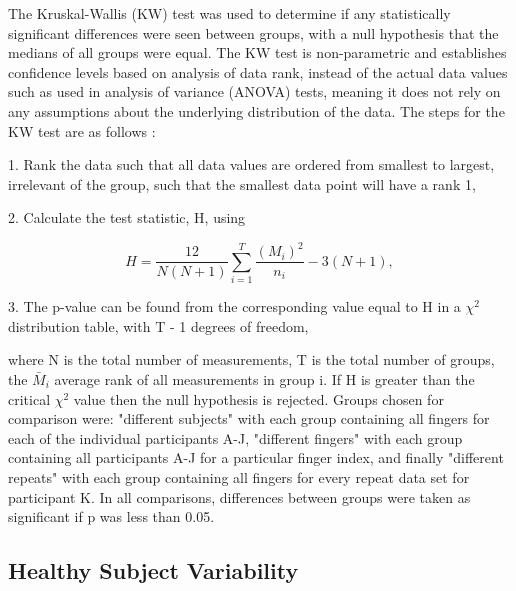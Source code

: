 \documentclass[twoside]{bhamthesis}
\theoremstyle{definition}
\begin{document}
The Kruskal-Wallis (KW) test was used to determine if any statistically significant differences were seen between groups, with a null hypothesis that the medians of all groups were equal. The KW test is non-parametric and establishes confidence levels based on analysis of data rank, instead of the actual data values such as used in analysis of variance (ANOVA) tests, meaning it does not rely on any assumptions about the underlying distribution of the data. The steps for the KW test are as follows \cite{altman1990practical}:

1. Rank the data such that all data values are ordered from smallest to largest, irrelevant of the group, such that the smallest data point will have a rank 1, 

2. Calculate the test statistic, H, using


\begin{equation}
 H =\frac{12}{N(N+1)} \sum_{i=1}^{T} \frac{(M_i)^2}{n_i} - 3(N+1),
  \label{eqn:dark_noise}
\end{equation}

3. The p-value can be found from the corresponding value equal to H in a $\chi^2$ distribution table, with T - 1 degrees of freedom,



where N is the total number of measurements, T is the total number of groups, the $\bar{M}_i$ average rank of all measurements in group i. If H is greater than the critical $\chi^2$ value then the null hypothesis is rejected. Groups chosen for comparison were:
 "different subjects" with each group containing all fingers for each of the individual participants A-J,  "different fingers" with each group containing all participants A-J for a particular finger index, and finally "different repeats" with each group containing all fingers for every repeat data set for participant K. In all comparisons, differences between groups were taken as significant if p was less than 0.05.

\subsection{Healthy Subject Variability}
\end{document}
